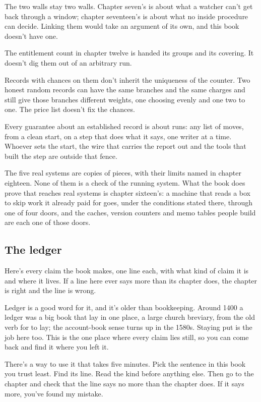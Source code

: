 \documentclass[11pt,twoside]{article}
\theoremstyle{thielethm}
\theoremstyle{thieledef}
\theoremstyle{thieledef}
\theoremstyle{thieledef}
\theoremstyle{thielethm}
\theoremstyle{thieleobs}
\theoremstyle{thielethm}
\begin{document}
The two walls stay two walls. Chapter seven's is about what a watcher can't get back through a window; chapter seventeen's is about what no inside procedure can decide. Linking them would take an argument of its own, and this book doesn't have one.

The entitlement count in chapter twelve is handed its groups and its covering. It doesn't dig them out of an arbitrary run.

Records with chances on them don't inherit the uniqueness of the counter. Two honest random records can have the same branches and the same charges and still give those branches different weights, one choosing evenly and one two to one. The price list doesn't fix the chances.

Every guarantee about an established record is about runs: any list of moves, from a clean start, on a step that does what it says, one writer at a time. Whoever sets the start, the wire that carries the report out and the tools that built the step are outside that fence.

The five real systems are copies of pieces, with their limits named in chapter eighteen. None of them is a check of the running system. What the book does prove that reaches real systems is chapter sixteen's: a machine that reads a box to skip work it already paid for goes, under the conditions stated there, through one of four doors, and the caches, version counters and memo tables people build are each one of those doors.

\subsection{The ledger}

Here's every claim the book makes, one line each, with what kind of claim it is and where it lives. If a line here ever says more than its chapter does, the chapter is right and the line is wrong.

Ledger is a good word for it, and it's older than bookkeeping. Around 1400 a ledger was a big book that lay in one place, a large church breviary, from the old verb for to lay; the account-book sense turns up in the 1580s. Staying put is the job here too. This is the one place where every claim lies still, so you can come back and find it where you left it.

There's a way to use it that takes five minutes. Pick the sentence in this book you trust least. Find its line. Read the kind before anything else. Then go to the chapter and check that the line says no more than the chapter does. If it says more, you've found my mistake.
\end{document}
